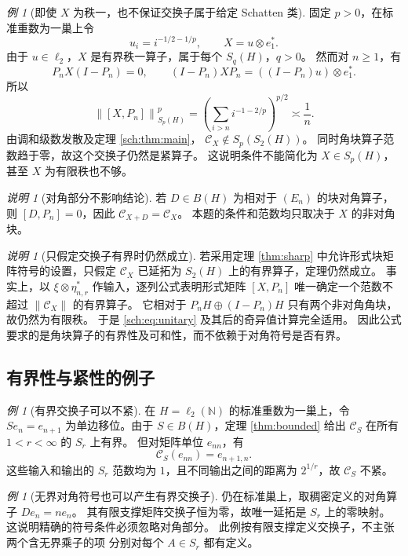 \documentclass[UTF8,11pt,a4paper,fontset=fandol]{ctexart}
\theoremstyle{remark}
\newtheorem{remark}[theorem]{说明}
\newtheorem{example}[theorem]{例}
\newcommand{\CC}{\mathcal C}
\newcommand{\norm}[1]{\left\lVert #1\right\rVert}
\numberwithin{equation}{section}
\begin{document}
\begin{example}[即使 $X$ 为秩一，也不保证交换子属于给定 Schatten 类]
固定 $p>0$，在标准重数为一巢上令
\[
 u_i=i^{-1/2-1/p},\qquad
 X=u\otimes e_1^*.
\]
由于 $u\in\ell_2$，$X$ 是有界秩一算子，属于每个 $S_q(H)$，$q>0$。
然而对 $n\geq1$，有
\[
 P_nX(I-P_n)=0,\qquad
 (I-P_n)XP_n=((I-P_n)u)\otimes e_1^*.
\]
所以
\[
 \norm{[X,P_n]}_{S_p(H)}^p
 =\left(\sum_{i>n}i^{-1-2/p}\right)^{p/2}
 \asymp\frac1n.
\]
由调和级数发散及定理 \ref{sch:thm:main}，
$\CC_X\notin S_p(S_2(H))$。
同时角块算子范数趋于零，故这个交换子仍然是紧算子。
这说明条件不能简化为 $X\in S_p(H)$，甚至 $X$ 为有限秩也不够。
\end{example}

\begin{remark}[对角部分不影响结论]
若 $D\in B(H)$ 为相对于 $(E_n)$ 的块对角算子，则
$[D,P_n]=0$，因此 $\CC_{X+D}=\CC_X$。
本题的条件和范数均只取决于 $X$ 的非对角块。
\end{remark}

\begin{remark}[只假定交换子有界时仍然成立]
若采用定理 \ref{thm:sharp} 中允许形式块矩阵符号的设置，只假定
$\CC_X$ 已延拓为 $S_2(H)$ 上的有界算子，定理仍然成立。
事实上，以 $\xi\otimes\eta_{n,r}^*$ 作输入，逐列公式表明形式矩阵
$[X,P_n]$ 唯一确定一个范数不超过 $\norm{\CC_X}$ 的有界算子。
它相对于 $P_nH\oplus(I-P_n)H$ 只有两个非对角角块，故仍然为有限秩。
于是 \eqref{sch:eq:unitary} 及其后的奇异值计算完全适用。
因此公式要求的是角块算子的有界性及可和性，而不依赖于对角符号是否有界。
\end{remark}

\subsection{有界性与紧性的例子}

\begin{example}[有界交换子可以不紧]
在 $H=\ell_2(\mathbb N)$ 的标准重数为一巢上，令
$Se_n=e_{n+1}$ 为单边移位。由于 $S\in B(H)$，定理 \ref{thm:bounded}
给出 $\CC_S$ 在所有 $1<r<\infty$ 的 $S_r$ 上有界。
但对矩阵单位 $e_{nn}$，有
\[
 \CC_S(e_{nn})=e_{n+1,n}.
\]
这些输入和输出的 $S_r$ 范数均为 $1$，且不同输出之间的距离为
$2^{1/r}$，故 $\CC_S$ 不紧。
\end{example}

\begin{example}[无界对角符号也可以产生有界交换子]
仍在标准巢上，取稠密定义的对角算子 $De_n=ne_n$。
其有限支撑矩阵交换子恒为零，故唯一延拓是 $S_r$ 上的零映射。
这说明精确的符号条件必须忽略对角部分。
此例按有限支撑定义交换子，不主张两个含无界乘子的项
分别对每个 $A\in S_r$ 都有定义。
\end{example}
\end{document}
